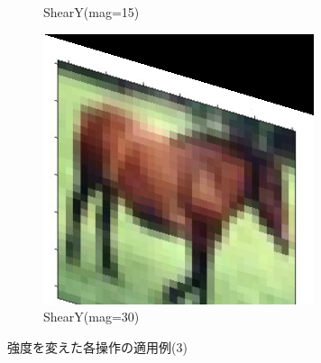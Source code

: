 \documentclass[onecolumn]{ujarticle}   %
\begin{document}
\begin{figure}[h]
\begin{subfigure}{0.3\columnwidth}
        \caption{ShearY(mag=15)}
        \label{fig:ShearY_15}
      \end{subfigure}
      \begin{subfigure}{0.3\columnwidth}
        \centering
        \includegraphics[width=1.0\columnwidth]{transform_test/ShearY_30.png}
        \caption{ShearY(mag=30)}
        \label{fig:ShearY_30}
      \end{subfigure}

      \caption{強度を変えた各操作の適用例(3)}
      \label{fig:OperationsWithVariousMagnitude3}
    \end{figure}
\end{document}
